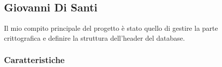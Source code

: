 \documentclass[a4paper,12pt]{report}
\begin{document}
%
%

\subsection{Giovanni Di Santi}

Il mio compito principale del progetto è stato quello di gestire la parte crittografica e
definire la struttura dell'header del database.

\subsubsection{Caratteristiche}
\end{document}

